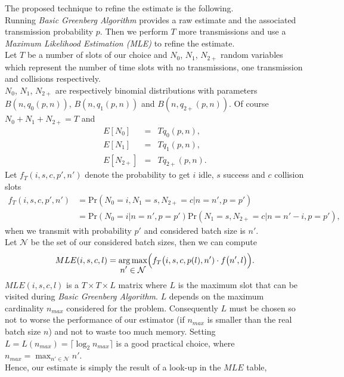 \documentclass[12pt,a4paper]{report}
\DeclareMathOperator*{\argmax}{arg\,max}
\DeclareMathOperator*{\mymax}{max}
\begin{document}
 The proposed technique to refine the estimate is the following.\\
 Running \emph{Basic Greenberg Algorithm} provides a raw estimate and the associated transmission probability $p$. Then we perform $T$ more transmissions and use a \emph{Maximum Likelihood Estimation (MLE)} to refine the estimate.\\ 
 
 Let $T$ be a number of slots of our choice and $N_{0}$, $N_{1}$, $N_{2+}$ random variables which represent the number of time slots with no transmissions, one transmission and collisions respectively.\\
 $N_{0}$, $N_{1}$, $N_{2+}$ are respectively binomial distributions with parameters $B(n,q_{0}(p,n))$, $B(n,q_{1}(p,n))$ and $B(n,q_{2+}(p,n))$. Of course $N_{0}+N_{1}+N_{2+}=T$ and
 \begin{eqnarray*}
E[N_{0}] &=& Tq_{0}(p,n),\\
E[N_{1}] &=& Tq_{1}(p,n),\\
E[N_{2+}] &=& Tq_{2+}(p,n).
\end{eqnarray*}
Let $f_{T}(i,s,c,p',n')$ denote the probability to get $i$ idle, $s$ success and
 $c$ collision slots \begin{align}
f_{T}(i,s,c,p',n')&= \textrm{Pr}(N_{0}=i,N_{1}=s,N_{2+}=c|n=n',p=p')\\
\nonumber
 &=\textrm{Pr}(N_{0}=i|n=n',p=p')\textrm{Pr}(N_{1}=s,N_{2+}=c|n=n'-i,p=p'),
\end{align}
when we transmit with probability $p'$ and considered batch size is $n'$.\\
Let $\mathcal{N}$ be the set of our considered batch sizes, then we can compute
\begin{equation}
MLE(i,s,c,l)=\argmax_{\displaystyle{n' \in \mathcal{N}}} \Bigl( f_{T}\bigl(i,s,c,p(l),n')\cdot f\bigl(n',l\bigr)\Bigr).
\end{equation}
$MLE(i,s,c,l)$ is a $T \times T \times L$ matrix where $L$ is the maximum slot that can be visited during \emph{Basic Greenberg Algorithm}. $L$ depends on the maximum cardinality  $n_{max}$ considered for the problem. Consequently  $L$ must be chosen so not to worse the performance of our estimator (if $n_{max}$ is smaller than the real batch size $n$) and not to waste too much memory. Setting $L= L(n_{max}) = \lceil\log_{2}n_{max}\rceil$ is a good practical choice, where $\displaystyle n_{max}= \mymax_{n' \in \mathcal{N}}{n'}$.\\
Hence, our estimate is simply the result of a look-up in the $MLE$ table,
\end{document}
